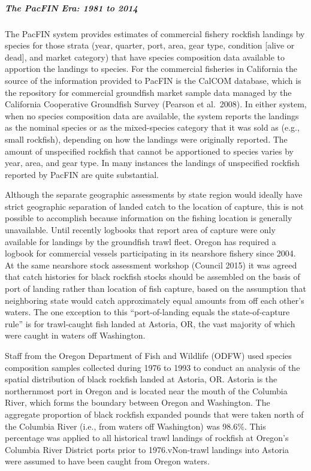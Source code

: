 \documentclass[11pt,
  english,
  letterpaper,
]{article}
\begin{document}
\hypertarget{the-pacfin-era-1981-to-2014}{%
\subparagraph{The PacFIN Era: 1981 to 2014}\label{the-pacfin-era-1981-to-2014}}

The PacFIN system provides estimates of commercial fishery rockfish landings by species for those strata (year, quarter, port, area, gear type, condition {[}alive or dead{]}, and market category) that have species composition data available to apportion the landings to species. For the commercial fisheries in California the source of the information provided to PacFIN is the CalCOM database, which is the repository for commercial groundfish market sample data managed by the California Cooperative Groundfish Survey (Pearson et al.~2008). In either system, when no species composition data are available, the system reports the landings as the nominal species or as the mixed-species category that it was sold as (e.g., small rockfish), depending on how the landings were originally reported. The amount of unspecified rockfish that cannot be apportioned to species varies by year, area, and gear type. In many instances the landings of unspecified rockfish reported by PacFIN are quite substantial.

Although the separate geographic assessments by state region would ideally have strict geographic separation of landed catch to the location of capture, this is not possible to accomplish because information on the fishing location is generally unavailable. Until recently logbooks that report area of capture were only available for landings by the groundfish trawl fleet. Oregon has required a logbook for commercial vessels participating in its nearshore fishery since 2004. At the same nearshore stock assessment workshop (Council 2015) it was agreed that catch histories for black rockfish stocks should be assembled on the basis of port of landing rather than location of fish capture, based on the assumption that neighboring state would catch approximately equal amounts from off each other's waters. The one exception to this ``port-of-landing equals the state-of-capture rule'' is for trawl-caught fish landed at Astoria, OR, the vast majority of which were caught in waters off Washington.

Staff from the Oregon Department of Fish and Wildlife (ODFW) used species composition samples collected during 1976 to 1993 to conduct an analysis of the spatial distribution of black rockfish landed at Astoria, OR. Astoria is the northernmost port in Oregon and is located near the mouth of the Columbia River, which forms the boundary between Oregon and Washington. The aggregate proportion of black rockfish expanded pounds that were taken north of the Columbia River (i.e., from waters off Washington) was 98.6\%. This percentage was applied to all historical trawl landings of rockfish at Oregon's Columbia River District ports prior to 1976.vNon-trawl landings into Astoria were assumed to have been caught from Oregon waters.
\end{document}
